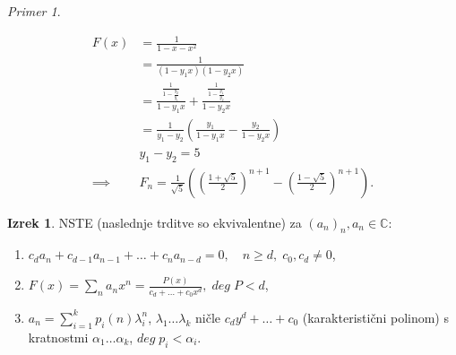 \documentclass[a4paper, 12pt]{book}
\theoremstyle{definition}
\newtheorem{theorem}[counter]{Izrek}
\theoremstyle{remark}
\newtheorem*{ex}{Primer}
\newcommand{\C}{\mathbb{C}}
\begin{document}
\begin{ex}
\begin{enumerate}[label=(\arabic*)]

      \begin{align*}
        F(x) &= \frac{1}{1-x-x^2} \\
        &= \frac{1}{(1-y_1 x) (1-y_2 x)} \\
        &= \frac{\frac{1}{1-\frac{y_2}{y_1}}}{1-y_1 x} + \frac{\frac{1}{1-\frac{y_1}{y_2}}}{1-y_2 x} \\&= 
        \frac{1}{y_1 - y_2} \left(\frac{y_1}{1-y_1 x} - \frac{y_2}{1-y_2 x}\right) \\
        &y_1 - y_2 = 5 \\
        \implies &F_n = \frac{1}{\sqrt{5}} \left(\left(\frac{1+\sqrt{5}}{2}\right)^{n+1} - \left(\frac{1-\sqrt{5}}{2}\right)^{n+1}\right).
      \end{align*}
  \end{enumerate}
\end{ex}
\begin{theorem}
  NSTE (naslednje trditve so ekvivalentne) za $(a_n)_n, a_n \in \C$:
  \begin{enumerate}[label=(\arabic*)]
    \item $c_d a_n + c_{d-1} a_{n-1} + \dots + c_n a_{n-d} = 0, \quad n \geq d, \; c_0,c_d \neq 0$,
    \item $F(x) = \sum_n a_n x^n = \frac{P(x)}{c_d + \dots + c_0 x^d}, \; deg \; P < d$,
    \item $a_n = \sum_{i=1}^{k} p_i(n) \lambda_i^n$, $\lambda_1 \dots \lambda_k$ ničle $c_d y^d + \dots + c_0$
      (karakteristični polinom) s kratnostmi $\alpha_1 \dots \alpha_k$, $deg \; p_i < \alpha_i$.
  \end{enumerate}
\end{theorem}
\end{document}
